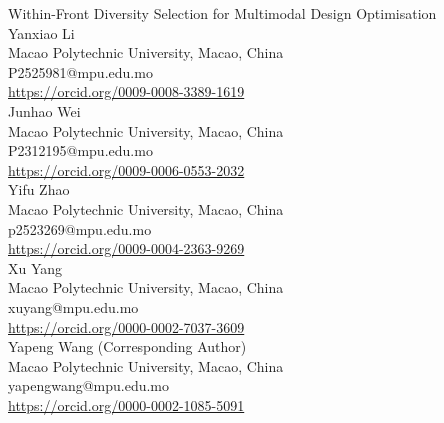 \documentclass[12pt,a4paper]{article}
\date{}
\renewcommand{\_}{\textunderscore\allowbreak}
\begin{document}
\linenumbers

\begin{center}
{\Huge Within-Front Diversity Selection for Multimodal Design Optimisation}
\\[5ex]

{\large Yanxiao Li} \\
{\small
Macao Polytechnic University, Macao, China \\
P2525981@mpu.edu.mo \\
\url{https://orcid.org/0009-0008-3389-1619}
} \\[1.2em]

{\large Junhao Wei} \\
{\small
Macao Polytechnic University, Macao, China \\
P2312195@mpu.edu.mo \\
\url{https://orcid.org/0009-0006-0553-2032}
} \\[1.2em]

{\large Yifu Zhao} \\
{\small
Macao Polytechnic University, Macao, China \\
p2523269@mpu.edu.mo \\
\url{https://orcid.org/0009-0004-2363-9269}
} \\[1.2em]

{\large Xu Yang} \\
{\small
Macao Polytechnic University, Macao, China \\
xuyang@mpu.edu.mo \\
\url{https://orcid.org/0000-0002-7037-3609}
} \\[1.2em]

{\large Yapeng Wang \small(Corresponding Author)} \\
{\small
Macao Polytechnic University, Macao, China \\
yapengwang@mpu.edu.mo \\
\url{https://orcid.org/0000-0002-1085-5091}
}
\end{center}
\end{document}

